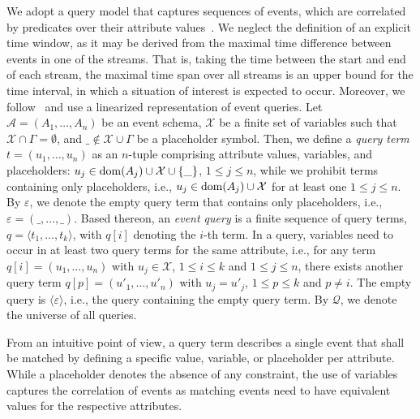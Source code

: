 We adopt a query model that captures sequences of events,
which are correlated by predicates over their attribute
values~\cite{DBLP:conf/sigmod/ZhangDI14}. We neglect the
definition of an explicit time window, as it may be
derived from the maximal time difference between events in
one of the streams. That is, taking the time between the start and end of
each stream, the maximal time span over all streams is an upper bound for the
time interval, in which a situation of interest is expected to occur.
Moreover, we
follow~\cite{DBLP:conf/btw/Kleest-Meissner23} and use a
linearized representation of event queries.
Let $\mathcal{A}= (A_1, \ldots,
A_n)$ be an event schema, $\mathcal{X}$ be a finite set of
variables
such that $\mathcal{X}\cap
\Gamma=\emptyset$, and $\_ \notin \mathcal{X}\cup
\Gamma$ be a placeholder symbol. Then, we define a
\emph{query
term} $t=(u_{1},\ldots,u_{n})$ as an $n$-tuple comprising
attribute
values, variables, and placeholders:
$u_{j}\in \operatorname{dom}(A_j) \cup \mathcal{X} \cup \{ \_ \}$,
$1\leq j\leq n$, while we prohibit terms containing only
placeholders, i.e., $u_{j}\in
\operatorname{dom}(A_j) \cup \mathcal{X}$ for at least one $1\leq j\leq n$.
By $\varepsilon$, we denote the empty query term that
contains only
placeholders, i.e., %
$\varepsilon=(\_,\dots,\_)$.
Based thereon, an \emph{event
query} is a finite sequence of query terms, $q=\langle
t_1,\ldots,t_k \rangle$,
with $q[i]$ denoting the $i$-th term. In a query, variables need to occur in at
least two query terms for the same attribute, i.e., for any term
$q[i]=(u_{1},\ldots,u_{n})$ with $u_j\in \mathcal{X}$,
$1\leq i\leq k$ and $1\leq j\leq n$, there exists another query term
$q[p]=(u'_{1},\ldots,u'_{n})$ with $u_j = u'_j$,
$1\leq p\leq k$ and $p\neq i$. The empty query is
$\langle\varepsilon\rangle$, i.e., the query containing
the empty query term. By $\mathcal{Q}$, we denote the
universe of all queries.

From an intuitive point of view, a query term describes a
single event that shall be matched by defining a specific
value, variable, or placeholder per attribute. While a
placeholder denotes the absence of any constraint, the use
of variables captures the correlation of events as
matching events need to have equivalent values for the
respective attributes.


